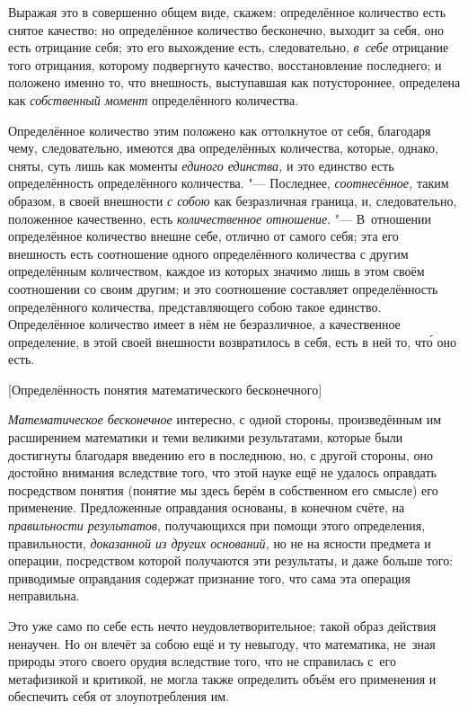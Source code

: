 Выражая это в совершенно общем виде, скажем: определённое количество есть
снятое качество; но определённое количество бесконечно, выходит за себя, оно
есть отрицание себя; это его выхождение есть, следовательно, {\em в~себе}
отрицание того отрицания, которому подвергнуто качество, восстановление
последнего; и положено именно то, что внешность, выступавшая как потустороннее,
определена как {\em собственный момент} определённого количества.

Определённое количество этим положено как оттолкнутое от себя, благодаря чему,
следовательно, имеются два определённых количества, которые, однако, сняты,
суть лишь как моменты {\em единого единства,} и это единство есть
определённость определённого количества. "--- Последнее, {\em соотнесённое,}
таким образом, в своей внешности {\em с собою} как безразличная граница, и,
следовательно, положенное качественно, есть {\em количественное отношение}.
"--- В~отношении определённое количество внешне себе, отлично от самого себя;
эта его внешность есть соотношение одного определённого количества с другим
определённым количеством, каждое из которых значимо лишь в этом своём
соотношении со своим другим; и это соотношение составляет определённость
определённого количества, представляющего собою такое единство. Определённое
количество имеет в нём не безразличное, а качественное определение, в этой
своей внешности возвратилось в себя, есть в ней то, чт\'{о} оно есть.

%
{[Определённость понятия математического бесконечного]}

{\em Математическое бесконечное} интересно, с одной стороны, произведённым им
расширением математики и теми великими результатами, которые были достигнуты
благодаря введению его в последнюю, но, с другой стороны, оно достойно внимания
вследствие того, что этой науке ещё не удалось оправдать посредством понятия
(понятие мы здесь берём в собственном его смысле) его применение. Предложенные
оправдания основаны, в конечном счёте, на {\em правильности результатов,}
получающихся при помощи этого определения, правильности,
{\em доказанной из других оснований,} но не на ясности предмета и операции,
посредством которой получаются эти результаты, и даже больше того: приводимые
оправдания содержат признание того, что сама эта операция неправильна.

Это уже само по себе есть нечто неудовлетворительное; такой образ действия
ненаучен. Но он влечёт за собою ещё и ту невыгоду, что математика, не~зная
природы этого своего орудия вследствие того, что не справилась с~его
метафизикой и критикой, не могла также определить объём его применения
и обеспечить себя от злоупотребления им.

